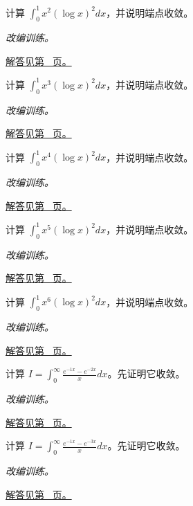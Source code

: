 \documentclass[12pt,fontset=fandol]{ctexart}
\begin{document}
\begin{example}[对数权重的定积分]\label{ex:c20q8}
计算 $\displaystyle\int_0^1x^{2}(\log x)^2dx$，并说明端点收敛。
\par\textit{改编训练。}\par\hyperref[ans:c20q8]{解答见第~\pageref{ans:c20q8} 页。}
\end{example}
\begin{example}[对数权重的定积分]\label{ex:c20q9}
计算 $\displaystyle\int_0^1x^{3}(\log x)^2dx$，并说明端点收敛。
\par\textit{改编训练。}\par\hyperref[ans:c20q9]{解答见第~\pageref{ans:c20q9} 页。}
\end{example}
\begin{example}[对数权重的定积分]\label{ex:c20q10}
计算 $\displaystyle\int_0^1x^{4}(\log x)^2dx$，并说明端点收敛。
\par\textit{改编训练。}\par\hyperref[ans:c20q10]{解答见第~\pageref{ans:c20q10} 页。}
\end{example}
\begin{example}[对数权重的定积分]\label{ex:c20q11}
计算 $\displaystyle\int_0^1x^{5}(\log x)^2dx$，并说明端点收敛。
\par\textit{改编训练。}\par\hyperref[ans:c20q11]{解答见第~\pageref{ans:c20q11} 页。}
\end{example}
\begin{example}[对数权重的定积分]\label{ex:c20q12}
计算 $\displaystyle\int_0^1x^{6}(\log x)^2dx$，并说明端点收敛。
\par\textit{改编训练。}\par\hyperref[ans:c20q12]{解答见第~\pageref{ans:c20q12} 页。}
\end{example}
\begin{example}[两个衰减指数的消差]\label{ex:c20q13}
计算 $I=\displaystyle\int_0^\infty\frac{e^{-1x}-e^{-2x}}x dx$。先证明它收敛。
\par\textit{改编训练。}\par\hyperref[ans:c20q13]{解答见第~\pageref{ans:c20q13} 页。}
\end{example}
\begin{example}[两个衰减指数的消差]\label{ex:c20q14}
计算 $I=\displaystyle\int_0^\infty\frac{e^{-1x}-e^{-3x}}x dx$。先证明它收敛。
\par\textit{改编训练。}\par\hyperref[ans:c20q14]{解答见第~\pageref{ans:c20q14} 页。}
\end{example}
\end{document}
